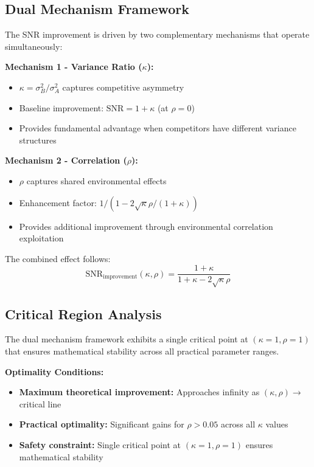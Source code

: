 \subsection{Dual Mechanism Framework}

The SNR improvement is driven by two complementary mechanisms that operate simultaneously:

\textbf{Mechanism 1 - Variance Ratio ($\kappa$):}
\begin{itemize}
    \item $\kappa = \sigma_B^2/\sigma_A^2$ captures competitive asymmetry
    \item Baseline improvement: $\text{SNR} = 1 + \kappa$ (at $\rho = 0$)
    \item Provides fundamental advantage when competitors have different variance structures
\end{itemize}

\textbf{Mechanism 2 - Correlation ($\rho$):}
\begin{itemize}
    \item $\rho$ captures shared environmental effects
    \item Enhancement factor: $1/(1 - 2\sqrt{\kappa}\rho/(1+\kappa))$
    \item Provides additional improvement through environmental correlation exploitation
\end{itemize}

The combined effect follows:
\begin{equation}
\text{SNR}_{\text{improvement}}(\kappa, \rho) = \frac{1 + \kappa}{1 + \kappa - 2\sqrt{\kappa}\rho} \label{eq:dual_mechanism}
\end{equation}

\subsection{Critical Region Analysis}

The dual mechanism framework exhibits a single critical point at $(\kappa=1, \rho=1)$ that ensures mathematical stability across all practical parameter ranges.

\textbf{Optimality Conditions:}
\begin{itemize}
    \item \textbf{Maximum theoretical improvement:} Approaches infinity as $(\kappa,\rho) \rightarrow$ critical line
    \item \textbf{Practical optimality:} Significant gains for $\rho > 0.05$ across all $\kappa$ values
    \item \textbf{Safety constraint:} Single critical point at $(\kappa=1, \rho=1)$ ensures mathematical stability
\end{itemize}

